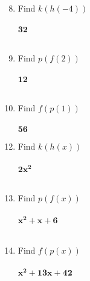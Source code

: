\documentclass{article}
\begin{document}
\noindent
\vspace{1cm}
\\
\begin{minipage}[t]{0.45\textwidth}
    \begin{enumerate}
        \setcounter{enumi}{7}
        \item Find $k(h(-4))$
        \\\\
              $\mathbf{32}$
        \\\\
        \item Find $p(f(2))$
        \\\\
              $\mathbf{12}$
        \\\\
        \item Find $f(p(1))$
        \\\\
              $\mathbf{56}$
        
    \end{enumerate}
\end{minipage}%
\hfill
\begin{minipage}[t]{0.45\textwidth}
    \begin{enumerate}
        \setcounter{enumi}{11} %
        \item Find $k(h(x))$
        \\\\
              $\mathbf{2x^2}$
        \\\\
        \item Find $p(f(x))$
        \\\\
              $\mathbf{x^2+x+6}$
        \\\\
        \item Find $f(p(x))$
        \\\\
              $\mathbf{x^2+13x+42}$
        
    \end{enumerate}
\end{minipage}
\end{document}
